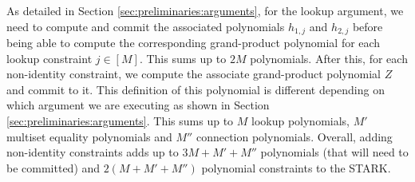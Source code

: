 As detailed in Section \ref{sec:preliminaries:arguments}, for the 
lookup argument, we need to compute and commit the associated polynomials $h_{1,j}$ and $h_{2,j}$ before being able to compute the corresponding grand-product polynomial for each lookup constraint $j \in [M]$. 
This sums up to $2M$ polynomials.
After this, for each non-identity constraint, we compute the associate grand-product polynomial $Z$ and commit to it. This definition of this polynomial is different depending on which argument we are executing as
shown in Section \ref{sec:preliminaries:arguments}.
This sums up to $M$ lookup polynomials, $M'$ multiset equality polynomials and $M''$ connection polynomials. Overall, adding non-identity constraints adds up to $3M + M' + M''$ polynomials (that will need to be committed) and $2(M+M'+M'')$ polynomial constraints to the STARK.


